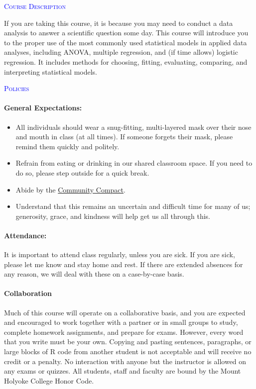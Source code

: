 \documentclass[12pt,a4paper]{article}
\begin{document}
\vspace{2mm}

\textcolor{blue}{\textsc{Course Description}}

If you are taking this course, it is because you may need to conduct a data analysis to answer a scientific question some day. This course will introduce you to the proper use
of the most commonly used statistical models in applied data analyses, including ANOVA, multiple regression, and (if time allows) logistic regression. It includes methods for choosing, fitting,
evaluating, comparing, and interpreting statistical models.

\vspace{2mm}

\textcolor{blue}{\textsc{Policies}}

\paragraph{General Expectations:}
\begin{itemize}
\item All individuals should wear a snug-fitting, multi-layered mask over their nose and mouth in class (at all times). If someone forgets their mask, please remind them quickly and politely.
\item Refrain from eating or drinking in our shared classroom space. If you need to do so, please step outside for a quick break.
\item Abide by the \href{https://www.mtholyoke.edu/opening-gates/community-compact-students}{Community Compact}.
\item Understand that this remains an uncertain and difficult time for many of us; generosity, grace, and kindness will help get us all through this. 
\end{itemize}

\paragraph{Attendance:}

It is important to attend class regularly, unless you are sick. If you are sick, please let me know and stay home and rest. If there are extended absences for any reason, we will deal with these on a case-by-case basis.

\paragraph{Collaboration} Much of this course will operate on a collaborative basis, and you are expected and encouraged to work together with a partner or in small groups to study, complete homework assignments, and prepare for exams. However, every word that you write must be your own. Copying and pasting sentences, paragraphs, or large blocks of R code from another student is not acceptable and will receive no credit or a penalty. No interaction with anyone but the instructor is allowed on any exams or quizzes. All students, staff and faculty are bound by the Mount Holyoke College Honor Code.
\end{document}
